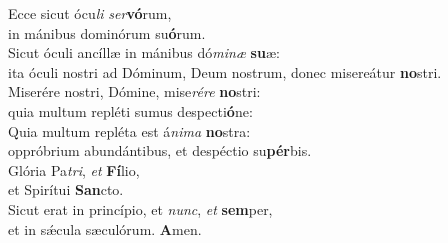 \evenverse Ecce sicut ócu\textit{li} \textit{ser}\textbf{vó}rum,~\*\\
\evenverse in mánibus dominórum su\textbf{ó}rum.\\
\oddverse Sicut óculi ancíllæ in mánibus dó\textit{mi}\textit{næ} \textbf{su}æ:~\*\\
\oddverse ita óculi nostri ad Dóminum, Deum nostrum, donec misereátur \textbf{no}stri.\\
\evenverse Miserére nostri, Dómine, mise\textit{ré}\textit{re} \textbf{no}stri:~\*\\
\evenverse quia multum repléti sumus despecti\textbf{ó}ne:\\
\oddverse Quia multum repléta est á\textit{ni}\textit{ma} \textbf{no}stra:~\*\\
\oddverse oppróbrium abundántibus, et despéctio su\textbf{pér}bis.\\
\evenverse Glória Pa\textit{tri}, \textit{et} \textbf{Fí}lio,~\*\\
\evenverse et Spirítui \textbf{San}cto.\\
\oddverse Sicut erat in princípio, et \textit{nunc}, \textit{et} \textbf{sem}per,~\*\\
\oddverse et in sǽcula sæculórum. \textbf{A}men.\\
